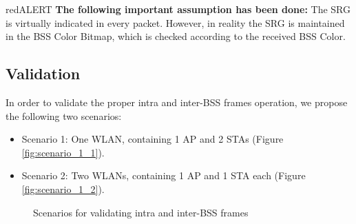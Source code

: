 \documentclass[]{article}
\begin{document}
	\begin{mybox}{red}{ALERT}
		\textbf{The following important assumption has been done:} The SRG is virtually indicated in every packet. However, in reality the SRG is maintained in the BSS Color Bitmap, which is checked according to the received BSS Color.		
	\end{mybox}
	
	\subsection{Validation}
	
	In order to validate the proper intra and inter-BSS frames operation, we propose the following two scenarios:	
	\begin{itemize}
		\item Scenario 1: One WLAN, containing 1 AP and 2 STAs (Figure \ref{fig:scenario_1_1}).
		\item Scenario 2: Two WLANs, containing 1 AP and 1 STA each (Figure \ref{fig:scenario_1_2}).
	\end{itemize}
	
	\begin{figure}
		\centering
		\caption{Scenarios for validating intra and inter-BSS frames}
	\end{figure}	
	
\end{document}

